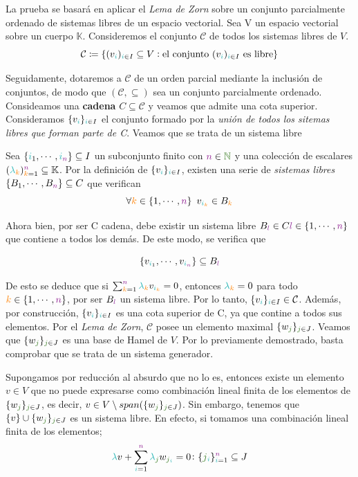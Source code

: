 \documentclass[titlepage,11pt,a4paper]{book}
\newcommand{\NN}{\ensuremath{\textcolor{OliveGreen}{\mathbb{N}}}}
\newcommand{\ii}{\ensuremath{\textcolor{TealBlue}{i}}}
\newcommand{\jj}{\ensuremath{\textcolor{OliveGreen}{j}}}
\newcommand{\nn}{\ensuremath{\textcolor{Plum}{n}}}
\newcommand{\KK}{\ensuremath{\mathbb{K}}}
\newcommand{\lamb}{\textcolor{TealBlue}{\lambda}}
\newcommand{\kk}{\textcolor{orange}{k}}
\newcommand{\lal}{\textcolor{Purple}{l}}
\begin{document}
\begin{dem}
La prueba se basará en aplicar el \textit{Lema de Zorn} sobre un conjunto parcialmente ordenado de sistemas libres de un espacio vectorial.
\medskip
Sea V un espacio vectorial sobre un cuerpo $\mathbb{K}$. Consideremos el conjunto $\mathcal{C}$ de todos los sistemas libres de $V$. 
$$
\mathcal{C} \coloneq \{(v_{\ii})_{\ii \in I} \subseteq V  : \text{el conjunto } (v_{\ii})_{\ii \in I} \text{ es libre}\}
$$

Seguidamente, dotaremos a $\mathcal{C}$ de un orden parcial mediante la inclusión de conjuntos, de modo que $(\mathcal{C}, \subseteq)$ sea un conjunto parcialmente ordenado.
Consideamos una \textbf{cadena} $C \subseteq \mathcal{C}$ y veamos que admite una cota superior.
\medskip
Consideramos $\{v_{\ii}\}_{\ii \in I}$ el conjunto formado por la \textit{unión de todos los sitemas libres que forman parte de C}. Veamos que se trata de un sistema libre

Sea $\{\ii_{1}, \cdots , \ii_{\nn}\} \subseteq I$ un subconjunto finito con $\nn \in \NN$ y una colección de escalares $(\lamb_{\kk})_{\kk = 1}^{\nn} \subseteq \KK$. Por la definición de $\{v_{\ii}\}_{\ii \in I}$, existen una serie de \textit{sistemas libres} $\{B_{1}, \cdots, B_{\nn}\} \subseteq C$ que verifican
\[
\forall \kk \in \{1, \cdots, \nn\} \hspace{5pt} v_{\ii_{\kk}} \in B_{\kk}
\]


Ahora bien, por ser C cadena, debe existir un sistema libre $B_{\lal} \in C \lal \in \{1, \cdots, \nn\}$ que contiene a todos los demás. De este modo, se verifica que 

\[
\{v_{\ii_{1}}, \cdots, v_{\ii_{\nn}}\} \subseteq B_{\lal}
\]

De esto se deduce que si $\sum_{\kk = 1}^{\nn} \lamb_{\kk} v_{\ii_{\kk}} = 0$, entonces $\lamb_{\kk} = 0$ para todo $\kk \in \{1, \cdots, \nn\}$, por ser $B_{\lal}$ un sistema libre. Por lo tanto, $\{v_{\ii}\}_{\ii \in I} \in \mathcal C$.
Además, por construcción, $\{v_{\ii}\}_{\ii \in I}$ es una cota superior de C, ya que contine a todos sus elementos. Por el \textit{Lema de Zorn}, $\mathcal{C}$ posee un elemento maximal $\{w_{\jj}\}_{\jj \in J}$. Veamos que $\{w_{\jj}\}_{\jj \in J}$ es una base de Hamel de $V$. Por lo previamente demostrado, basta comprobar que se trata de un sistema generador.

\medskip
Supongamos por reducción al absurdo que no lo es, entonces existe un elemento $v \in V$ que no puede expresarse como combinación lineal finita de los elementos de $\{w_{\jj}\}_{\jj \in J}$, es decir, $v \in V \setminus span(\{w_{\jj}\}_{\jj \in J})$. Sin embargo, tenemos que $\{v\} \cup \{w_{\jj}\}_{\jj \in J}$ es un sistema libre.
\smallskip
En efecto, si tomamos una combinación lineal finita de los elementos;
\[
\lamb v + \sum_{\ii = 1}^{\nn} \lamb_{\jj} w_{\jj_{\ii}} = 0 \colon \{\jj_{\ii}\}_{\ii = 1}^{\nn} \subseteq J
\]


\end{dem}
\end{document}
